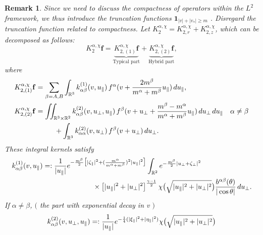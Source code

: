 \documentclass[reqno]{amsart}
\numberwithin{equation}{section}
\newtheorem{remark}[theorem]{Remark}
\numberwithin{equation}{section}
\begin{document}
	\begin{remark}\label{RK2211}
		Since we need to discuss the compactness of operators within the $L^2$ framework, we thus introduce the truncation functions $\mathbf{1}_{|v|+|v_*|\geq m}$ . Disregard the truncation function related to compactness. Let $K_{2}^{\alpha,\chi}=K_{2,r}^{\alpha,\chi}+K_{2,z}^{\alpha,\chi}$, which can be decomposed as follows:
		\begin{equation}
			K_{2}^{\alpha,\chi}\mathbf{f} = \underbrace{K_{2,(1)}^{\alpha,\chi}\mathbf{f}}_{\text{Typical part}} + \underbrace{K_{2,(2)}^{\alpha,\chi}\mathbf{f}}_{\text{Hybrid part}},
		\end{equation}
		where 
		\begin{align}
			&K_{2,(1)}^{\alpha,\chi}\mathbf{f}=\sum_{\beta=A,B}	\int_{\mathbb{R}^3}k_{\alpha \beta}^{(1)}(v,u_{\parallel})\,f^\alpha(v + \frac{2m^{\beta}}{m^{\alpha}+m^{\beta}}u_{\parallel}) \,d u_{\parallel},\\
			&K_{2,(2)}^{\alpha,\chi}\mathbf{f}= \iint_{\mathbb{R}^3\times\mathbb{R}^2}k_{\alpha \beta}^{(2)}(v,u_{\perp},u_{\parallel}) \,f^\beta(v + u_{\perp}+\frac{m^{\beta}-m^{\alpha}}{m^{\alpha}+m^{\beta}}u_{\parallel})\,du_{\perp}\,d u_{\parallel} \quad \alpha \neq \beta \notag\\
			&\hspace{2cm}+\int_{\mathbb{R}^3}k_{\alpha \alpha}^{(2)}(v,u_{\perp}) \,f^\beta(v + u_{\perp})\,du_{\perp}. \label{HBD264}
		\end{align}
		These integral kernels satisfy
		\begin{align}
			k_{\alpha \beta}^{(1)}(v,u_{\parallel}) &=:  \frac{1}{|u_{\parallel}|} e^{-\frac{m^\beta}{2}\big[|\zeta_{\parallel}|^2+(\frac{m^\alpha}{m^\alpha+m^\beta})^2|u_{\parallel}|^2\big]} \int_{\mathbb{R}^2} e^{-\frac{m^\beta}{2}|u_{\perp} + \zeta_{\perp}|^2} \notag\\
			&\hspace{2.5cm}\times  \left[|u_{\parallel}|^2 + |u_{\perp}|^2\right]^{\frac{\gamma - 1}{2}} \chi\big(\sqrt{|u_{\parallel}|^2 + |u_{\perp}|^2}\big) \frac{b^{ \alpha \beta}(\theta)}{|\cos \theta|} \, du_{\perp}.\label{ker1rnomrr}
		\end{align}
		If $\alpha \neq \beta$, $($ the part with exponential decay in v $)$
		\begin{align}
			k_{\alpha \beta}^{(2)}(v,u_{\perp},u_{\parallel})	&=:  \frac{1}{|u_{\parallel}|} e^{-\frac{1}{4}(|\xi_{\parallel}|^2+|\eta_{\parallel}|^2)} \chi\big(\sqrt{|u_{\parallel}|^2 + |u_{\perp}|^2}\big) \notag\\

\end{align}
\end{remark}
\end{document}
